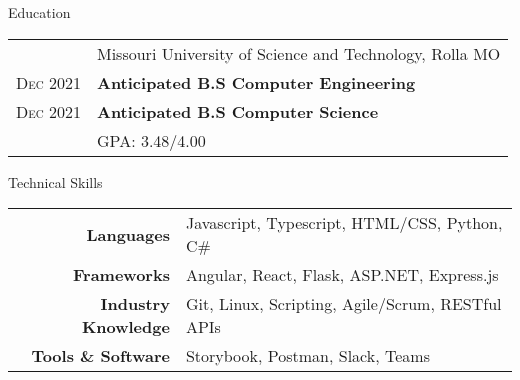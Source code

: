 \documentclass{resume}
\begin{document}
    
\begin{rSection}{Education}
    \small {
    \begin{tabular}{r|p{15cm}}
       & Missouri University of Science and Technology, Rolla MO  \\ 
      \textsc{Dec} 2021 & \textbf{Anticipated B.S Computer Engineering} \\ 
      \textsc{Dec} 2021 & \textbf{Anticipated B.S Computer Science} \\
      & GPA: 3.48/4.00 \\
    \end{tabular}
    }
\end{rSection}
      
\begin{rSection}{Technical Skills}
  \small
  {
      \begin{tabular}{rl}
      \multicolumn{1}{r|}{\textbf{Languages}} & Javascript, Typescript, HTML/CSS, Python, C\# \\
      \multicolumn{1}{r|}{\textbf{Frameworks}} & Angular, React, Flask, ASP.NET, Express.js \\
      \multicolumn{1}{r|}{\textbf{Industry Knowledge}} & Git, Linux, Scripting, Agile/Scrum, RESTful APIs \\
      \multicolumn{1}{r|}{\textbf{Tools \& Software}} & Storybook, Postman, Slack, Teams
      \end{tabular}
  }
\end{rSection}
\end{document}
